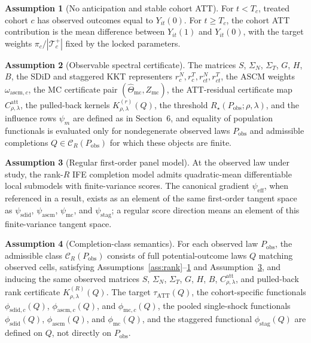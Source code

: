 \documentclass[11pt]{article}
\theoremstyle{definition}
\newtheorem{assumption}{Assumption}
\theoremstyle{plain}
\theoremstyle{remark}
\begin{document}
\begin{assumption}[No anticipation and stable cohort ATT]\label{ass:att}
For \(t<T_c\), treated cohort \(c\) has observed outcomes equal to \(Y_{it}(0)\).  For \(t\ge T_c\), the cohort ATT contribution is the mean difference between \(Y_{it}(1)\) and \(Y_{it}(0)\), with the target weights \(\pi_c/|\mathcal T_c^+|\) fixed by the locked parameters.
\end{assumption}

\begin{assumption}[Observable spectral certificate]\label{ass:kernel}
The matrices \(S\), \(\Sigma_N\), \(\Sigma_T\), \(G\), \(H\), \(B\), the SDiD and staggered KKT representers \(r^N_c,r^T_c,r^N_{ct},r^T_{ct}\), the ASCM weights \(\omega_{\mathrm{ascm},c}\), the MC certificate pair \((\widehat\Theta_{\mathrm{mc}},Z_{\mathrm{mc}})\), the ATT-residual certificate map \(C^{\mathrm{att}}_{\rho,\lambda}\), the pulled-back kernels \(K^{(r)}_{\rho,\lambda}(Q)\), the threshold \(R_\star(P_{\mathrm{obs}};\rho,\lambda)\), and the influence rows \(\psi_m\) are defined as in Section~6, and equality of population functionals is evaluated only for nondegenerate observed laws \(P_{\mathrm{obs}}\) and admissible completions \(Q\in\mathcal C_R(P_{\mathrm{obs}})\) for which these objects are finite.
\end{assumption}

\begin{assumption}[Regular first-order panel model]\label{ass:if}
At the observed law under study, the rank-\(R\) IFE completion model admits quadratic-mean differentiable local submodels with finite-variance scores.  The canonical gradient \(\psi_{\mathrm{eff}}\), when referenced in a result, exists as an element of the same first-order tangent space as \(\psi_{\mathrm{sdid}}\), \(\psi_{\mathrm{ascm}}\), \(\psi_{\mathrm{mc}}\), and \(\psi_{\mathrm{stag}}\); a regular score direction means an element of this finite-variance tangent space.
\end{assumption}

\begin{assumption}[Completion-class semantics]\label{ass:completion}
For each observed law \(P_{\mathrm{obs}}\), the admissible class \(\mathcal C_R(P_{\mathrm{obs}})\) consists of full potential-outcome laws \(Q\) matching observed cells, satisfying Assumptions~\ref{ass:rank}--\ref{ass:att} and Assumption~\ref{ass:if}, and inducing the same observed matrices \(S\), \(\Sigma_N\), \(\Sigma_T\), \(G\), \(H\), \(B\), \(C^{\mathrm{att}}_{\rho,\lambda}\), and pulled-back rank certificate \(K^{(R)}_{\rho,\lambda}(Q)\).  The target \(\tau_{\mathrm{ATT}}(Q)\), the cohort-specific functionals \(\phi_{\mathrm{sdid},c}(Q)\), \(\phi_{\mathrm{ascm},c}(Q)\), and \(\phi_{\mathrm{mc},c}(Q)\), the pooled single-shock functionals \(\phi_{\mathrm{sdid}}(Q)\), \(\phi_{\mathrm{ascm}}(Q)\), and \(\phi_{\mathrm{mc}}(Q)\), and the staggered functional \(\phi_{\mathrm{stag}}(Q)\) are defined on \(Q\), not directly on \(P_{\mathrm{obs}}\).
\end{assumption}
\end{document}

